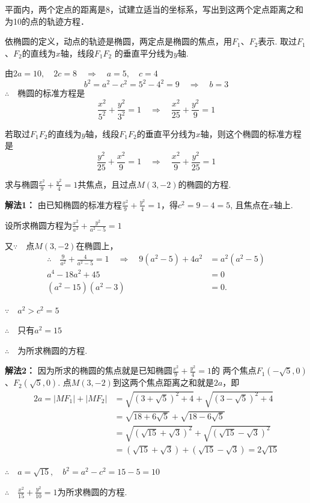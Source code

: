 \begin{example}
    平面内，两个定点的距离是8，试建立适当的坐标系，写出到这两个定点距离之和为10的点的轨迹方程．
\end{example}

\begin{solution}
依椭圆的定义，动点的轨迹是椭圆，两定点是椭圆的焦点，用$F_1$、$F_2$表示. 取过$F_1$、$F_2$的直线为$x$轴，线段$F_1F_2$
的垂直平分线为$y$轴.

由$2a=10,\quad 2c=8\quad \Rightarrow\quad a=5,\quad c=4$
\[b^2=a^2-c^2=5^2-4^2=9 \quad \Rightarrow\quad  b=3\]
$\therefore\quad $椭圆的标准方程是
\[\frac{x^2}{5^2}+\frac{y^2}{3^2}=1\quad \Rightarrow\quad \frac{x^2}{25}+\frac{y^2}{9}=1\]

若取过$F_1F_2$的直线为$y$轴，线段$F_1F_2$的垂直平分线为$x$轴，则这个椭圆的标准方程是
\[\frac{y^2}{25}+\frac{x^2}{9}=1\quad \Rightarrow\quad \frac{x^2}{9}+\frac{y^2}{25}=1\]
\end{solution}

\begin{example}
    求与椭圆$\frac{x^2}{9}+\frac{y^2}{4}=1$共焦点，且过点$M(3,-2)$的椭圆的方程.
\end{example}

\begin{solution}
    \textbf{解法1：} 由已知椭圆的标准方程$\frac{x^2}{9}+\frac{y^2}{4}=1$，得$c^2=9-4=5$, 且焦点在$x$轴上.

设所求椭圆方程为$\frac{x^2}{a^2}+\frac{y^2}{a^2-5}=1$

又$\because\quad $点$M(3,-2)$在椭圆上，
\[\begin{split}
 \therefore\quad \frac{9}{a^2}+\frac{4}{a^2-5}=1\quad \Rightarrow\quad 9(a^2-5)+4a^2&=a^2(a^2-5)\\
a^4-18a^2+45&=0\\
(a^2-15)(a^2-3)&=0.   
\end{split}\]

$\because\quad a^2>c^2=5$

$\therefore\quad $只有$a^2=15$

$\therefore\quad$为所求椭圆的方程.


\textbf{解法2：} 因为所求的椭圆的焦点就是已知椭圆$\frac{x^2}{9}+\frac{y^2}{4}=1$的
两个焦点$F_1(-\sqrt{5},0)$、$F_2(\sqrt{5},0)$. 点$M(3,-2)$到这两个焦点距离之和就是$2a$，即
\[\begin{split}
  2a=|MF_1|+|MF_2|&=\sqrt{\left(3+\sqrt{5}\right)^2+4}+\sqrt{\left(3-\sqrt{5}\right)^2+4}\\
  &=\sqrt{18+6\sqrt{5}}+\sqrt{18-6\sqrt{5}}  \\
  &=\sqrt{\left(\sqrt{15}+\sqrt{3}\right)^2}+\sqrt{\left(\sqrt{15}-\sqrt{3}\right)^2}\\
  &=\left(\sqrt{15}+\sqrt{3}\right)+\left(\sqrt{15}-\sqrt{3}\right)=2\sqrt{15}
\end{split}\]

$\therefore\quad a=\sqrt{15},\quad b^2=a^2-c^2=15-5=10$

$\therefore\quad \frac{x^2}{15}+\frac{y^2}{10}=1$为所求椭圆的方程.
\end{solution}

